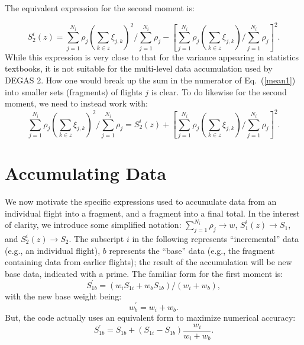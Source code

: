 \documentclass[12pt]{report}
\begin{document}
The equivalent expression for the second moment is:

\begin{equation}
S_{2}^{i}(z) = \sum_{j = 1}^{N_{i}} \rho_{j} \left (
\sum_{k \in z} \xi_{j,k} \right )^{2} / \sum_{j = 1}^{N_{i}} \rho_{j}
- \left [ \sum_{j = 1}^{N_{i}} \rho_{j} \left (
\sum_{k \in z} \xi_{j,k} \right ) / \sum_{j = 1}^{N_{i}} \rho_{j} \right ]^{2}.
\label{var1}
\end{equation}
While this expression is very close to that for the
variance appearing in statistics textbooks, it is not
suitable for the multi-level data accumulation used by
DEGAS 2.  
How one would break up the sum in the
numerator of Eq.~(\ref{mean1}) into smaller
sets (fragments) of
flights $j$ is clear.  
To do likewise for the second moment, we need to instead
work with:
\begin{equation}
\sum_{j = 1}^{N_{i}} \rho_{j} \left (
\sum_{k \in z} \xi_{j,k} \right )^{2} / \sum_{j = 1}^{N_{i}} \rho_{j} 
= S_{2}^{i}(z) + 
\left [ \sum_{j = 1}^{N_{i}} \rho_{j} \left (
\sum_{k \in z} \xi_{j,k} \right ) / \sum_{j = 1}^{N_{i}} \rho_{j} \right ]^{2}.
\label{var2}
\end{equation}

\section{Accumulating Data}
\label{accdata}
We now motivate the specific expressions used to accumulate
data from an individual flight into a fragment, and a fragment
into a final total.
In the interest of clarity, 
we introduce some simplified notation:
$\sum_{j = 1}^{N_{i}} \rho_{j} \rightarrow w$,
$S_{1}^{i}(z) \rightarrow S_{1}$, and $S_{2}^{i}(z) \rightarrow S_{2}$.
The subscript $i$ in the following represents ``incremental'' data
(e.g., an individual flight), $b$ represents the ``base'' data
(e.g., the fragment containing data from earlier flights);
the result of the accumulation will be new base data, indicated
with a prime.
The familiar form for the first moment is:
\begin{equation}
S_{1b}^{\prime} = (w_{i} S_{1i} + w_{b} S_{1b}) / (w_{i} + w_{b}),
\label{mean2}
\end{equation}
with the new base weight being:
\begin{equation}
w_{b}^{\prime} = w_{i} + w_{b}.
\label{weight}
\end{equation}
But, the code actually uses an equivalent form to maximize
numerical accuracy:
\begin{equation}
S_{1b}^{\prime} = S_{1b} + (S_{1i} - S_{1b})\frac{w_{i}}{w_{i} + w_{b}}.
\label{mean3}
\end{equation}
\end{document}
